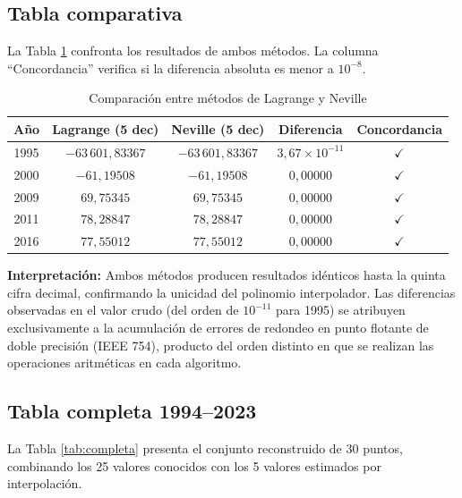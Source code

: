 \documentclass[12pt, letterpaper]{article}
\begin{document}
\subsection{Tabla comparativa}\label{subsec:comparativa}

La Tabla \ref{tab:comparativa} confronta los resultados de ambos métodos. La columna ``Concordancia'' verifica si la diferencia absoluta es menor a $10^{-8}$.

\begin{table}[H]
\centering
\caption{Comparación entre métodos de Lagrange y Neville}
\label{tab:comparativa}
\begin{tabular}{@{}ccccc@{}}
\toprule
\textbf{Año} & \textbf{Lagrange (5 dec)} & \textbf{Neville (5 dec)} & \textbf{Diferencia} & \textbf{Concordancia} \\
\midrule
1995 & $-63\,601{,}83367$ & $-63\,601{,}83367$ & $3{,}67 \times 10^{-11}$ & $\checkmark$ \\
2000 & $-61{,}19508$ & $-61{,}19508$ & $0{,}00000$ & $\checkmark$ \\
2009 & $69{,}75345$ & $69{,}75345$ & $0{,}00000$ & $\checkmark$ \\
2011 & $78{,}28847$ & $78{,}28847$ & $0{,}00000$ & $\checkmark$ \\
2016 & $77{,}55012$ & $77{,}55012$ & $0{,}00000$ & $\checkmark$ \\
\bottomrule
\end{tabular}
\end{table}

\textbf{Interpretación:} Ambos métodos producen resultados idénticos hasta la quinta cifra decimal, confirmando la unicidad del polinomio interpolador. Las diferencias observadas en el valor crudo (del orden de $10^{-11}$ para 1995) se atribuyen exclusivamente a la acumulación de errores de redondeo en punto flotante de doble precisión (IEEE 754), producto del orden distinto en que se realizan las operaciones aritméticas en cada algoritmo.

\subsection{Tabla completa 1994--2023}\label{subsec:tabla-completa}

La Tabla \ref{tab:completa} presenta el conjunto reconstruido de 30 puntos, combinando los 25 valores conocidos con los 5 valores estimados por interpolación.
\end{document}
